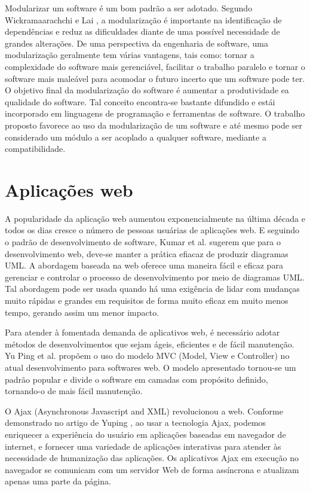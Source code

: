 Modularizar um software é um bom padrão a ser adotado. Segundo Wickramaarachchi e Lai \citep{7062705}, a modularização é importante na identificação de dependências e reduz as dificuldades diante de uma possível necessidade de grandes alterações. De uma perspectiva da engenharia de software, uma modularização geralmente tem várias vantagens, tais como: tornar a complexidade do software mais gerenciável, facilitar o trabalho paralelo e tornar o software mais maleável para acomodar o futuro incerto que um software pode ter. O objetivo final da modularização do software é aumentar a produtividade ea qualidade do software. Tal conceito encontra-se bastante difundido e estái incorporado em linguagens de programação e ferramentas de software. O trabalho proposto favorece ao uso da modularização de um software e até mesmo pode ser considerado um módulo a ser acoplado a qualquer software, mediante a compatibilidade.


\section{Aplicações web}\label{sec:apps_web}


A popularidade da aplicação web aumentou exponencialmente na última década e todos os dias cresce o número de pessoas usuárias de aplicações web. E seguindo o padrão de desenvolvimento de software, Kumar et al. \citep{7813710} sugerem que para o desenvolvimento web, deve-se manter a prática efiacaz de produzir diagramas UML. A abordagem baseada na web oferece uma maneira fácil e eficaz para gerenciar e controlar o processo de desenvolvimento por meio de diagramas UML. Tal abordagem pode ser usada quando há uma exigência de lidar com mudanças muito rápidas e grandes em requisitos de forma muito eficaz em muito menos tempo, gerando assim um menor impacto. 


Para atender à fomentada demanda de aplicativos web, é necessário adotar métodos de desenvolvimentos que sejam ágeis, eficientes e de fácil manutenção. Yu Ping et al. \cite{1372143} propõem o uso do modelo MVC (Model, View e Controller) no atual desenvolvimento para softwares web. O modelo apresentado tornou-se um padrão popular e divide o software em camadas com propósito definido, tornando-o de mais fácil manutenção.


O Ajax (Asynchronous Javascript and XML) revolucionou a web. Conforme demonstrado no artigo de Yuping \citep{6845605}, ao usar a tecnologia Ajax, podemos enriquecer a experiência do usuário em aplicações baseadas em navegador de internet, e fornecer uma variedade de aplicações interativas para atender às necessidade de humanização das aplicações.
Os aplicativos Ajax em execução no navegador se comunicam com um servidor Web de forma assíncrona e atualizam apenas uma parte da página.


